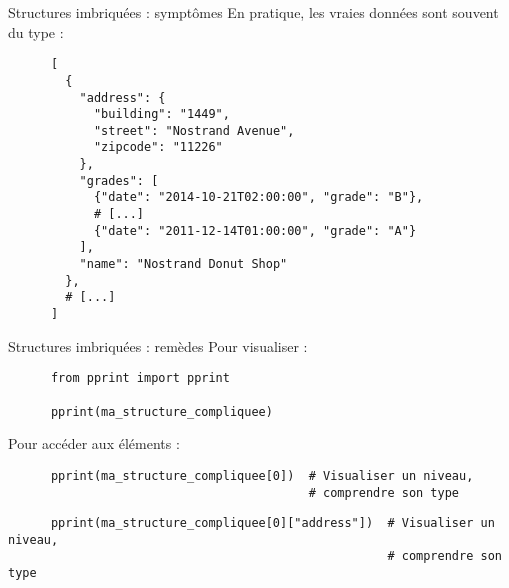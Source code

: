 \documentclass[10pt]{beamer}
\begin{document}
\begin{frame}[fragile]{Structures imbriquées : symptômes}
  En pratique, les vraies données sont souvent du type :

  \begin{beamercodeblock}
    \begin{verbatim}
      [
        {
          "address": {
            "building": "1449",
            "street": "Nostrand Avenue",
            "zipcode": "11226"
          },
          "grades": [
            {"date": "2014-10-21T02:00:00", "grade": "B"},
            # [...]
            {"date": "2011-12-14T01:00:00", "grade": "A"}
          ],
          "name": "Nostrand Donut Shop"
        },
        # [...]
      ]
    \end{verbatim}
  \end{beamercodeblock}
\end{frame}


\begin{frame}[fragile]{Structures imbriquées : remèdes}
  Pour visualiser :

  \begin{beamercodeblock}
    \begin{verbatim}
      from pprint import pprint

      pprint(ma_structure_compliquee)
    \end{verbatim}
  \end{beamercodeblock}
 
  Pour accéder aux éléments :

  \begin{beamercodeblock}
    \begin{verbatim}
      pprint(ma_structure_compliquee[0])  # Visualiser un niveau, 
                                          # comprendre son type
    \end{verbatim}
  \end{beamercodeblock}

  \pause

  \begin{beamercodeblock}
    \begin{verbatim}
      pprint(ma_structure_compliquee[0]["address"])  # Visualiser un niveau, 
                                                     # comprendre son type
    \end{verbatim}
  \end{beamercodeblock}
 \end{frame}
\end{document}
